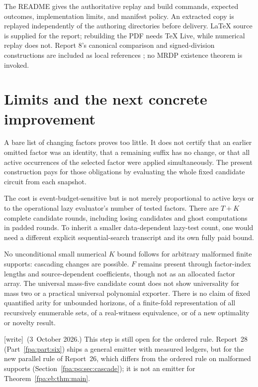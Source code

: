 \documentclass[11pt,a4paper]{article}
\numberwithin{equation}{section}
\newcommand{\wtag}{\textup{[write]}}
\begin{document}
The README gives the authoritative replay and build commands, expected outcomes, implementation limits, and manifest policy. An extracted copy is replayed independently of the authoring directories before delivery. LaTeX source is supplied for the report; rebuilding the PDF needs TeX Live, while numerical replay does not. Report 8's canonical comparison and signed-division constructions are included as local references \cite{fpa:eb:r8}; no MRDP existence theorem is invoked.

\section{Limits and the next concrete improvement}\label{fpa:rep:20:last}
A bare list of changing factors proves too little. It does not certify that an earlier omitted factor was an identity, that a remaining suffix has no change, or that all active occurrences of the selected factor were applied simultaneously. The present construction pays for those obligations by evaluating the whole fixed candidate circuit from each snapshot.

The cost is event-budget-sensitive but is not merely proportional to active keys or to the operational lazy evaluator's number of tested factors. There are $T+K$ complete candidate rounds, including losing candidates and ghost computations in padded rounds. To inherit a smaller data-dependent lazy-test count, one would need a different explicit sequential-search transcript and its own fully paid bound.

No unconditional small numerical $K$ bound follows for arbitrary malformed finite supports: cascading changes are possible. $F$ remains present through factor-index lengths and source-dependent coefficients, though not as an allocated factor array. The universal mass-five candidate count does not show universality for mass two or a practical universal polynomial exporter. There is no claim of fixed quantified arity for unbounded horizons, of a finite-fold representation of all recursively enumerable sets, of a real-witness equivalence, or of a new optimality or novelty result.

\wtag\ (3~October 2026.) This step is still open for the ordered rule. Report~28 (Part~\ref{fpa:part:six}) ships a general emitter with measured ledgers, but for the new parallel rule of Report~26, which differs from the ordered rule on malformed supports (Section~\ref{fpa:pq:sec:cascade}); it is not an emitter for Theorem~\ref{fpa:eb:thm:main}.
\end{document}
